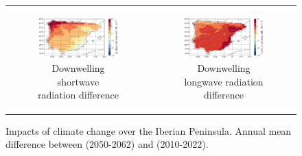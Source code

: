 \begin{figure}[htbp]
\begin{tabular}{cc}
        \begin{subfigure}[b]{0.5\textwidth}
            \caption{Downwelling shortwave radiation difference}
            \includegraphics[width=\textwidth]{images/chap4/future/diffmap_SWdnSFC_presfut.png}
        \end{subfigure} &
        \begin{subfigure}[b]{0.5\textwidth}
            \caption{Downwelling longwave radiation difference}
            \includegraphics[width=\textwidth]{images/chap4/future/diffmap_LWdnSFC_presfut.png}
        \end{subfigure} \\

    \end{tabular}
    \caption{Impacts of climate change over the Iberian Peninsula. Annual mean difference between \futnoirr (2050-2062) and  \presnoirr (2010-2022).}
    \label{fig:diffmaps_present_future}
\end{figure}

